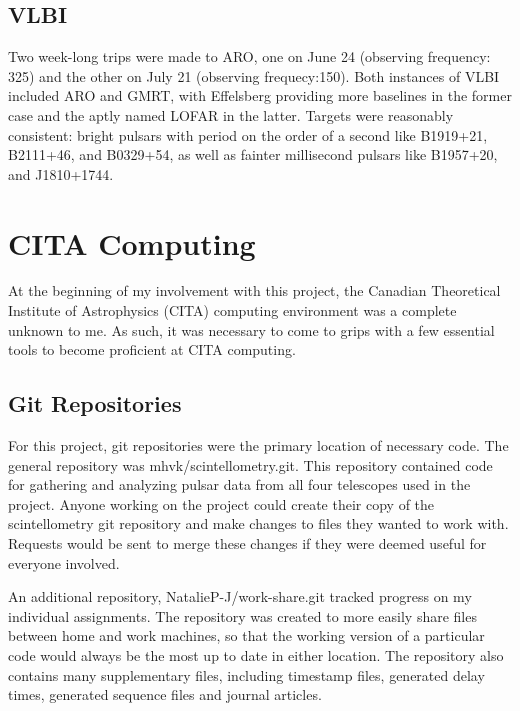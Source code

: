 \documentclass[a4paper,12pt]{article}
\begin{document}
\subsection{VLBI}
\label{vlbi}

Two week-long trips were made to ARO, one on June 24 (observing frequency: \unit{325}{\mega\hertz}) and the other on July 21 (observing frequecy:\unit{150}{\mega\hertz}). Both instances of VLBI included ARO and GMRT, with Effelsberg providing more baselines in the former case and the aptly named LOFAR in the latter. Targets were reasonably consistent: bright pulsars with period on the order of a second like B1919+21, B2111+46, and B0329+54, as well as fainter millisecond pulsars like B1957+20, and J1810+1744.

\section{CITA Computing}
\label{sec:CITAcomputing}

At the beginning of my involvement with this project, the Canadian Theoretical Institute of Astrophysics (CITA) computing environment was a complete unknown to me. As such, it was necessary to come to grips with a few essential tools to become proficient at CITA computing.

\subsection{Git Repositories}
\label{sec:git}

For this project, git repositories were the primary location of necessary code. The general repository was mhvk/scintellometry.git. This repository contained code for gathering and analyzing pulsar data from all four telescopes used in the project. Anyone working on the project could create their copy of the scintellometry git repository and make changes to files they wanted to work with. Requests would be sent to merge these changes if they were deemed useful for everyone involved.

An additional repository, NatalieP-J/work-share.git tracked progress on my individual assignments. The repository was created to more easily share files between home and work machines, so that the working version of a particular code would always be the most up to date in either location. The repository also contains many supplementary files, including timestamp files, generated delay times, generated sequence files and journal articles.
\end{document}
